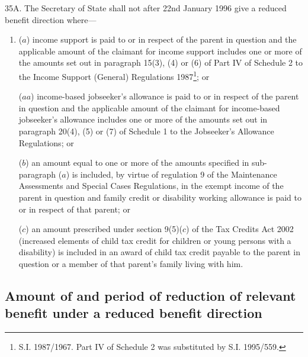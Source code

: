 \documentclass[a4paper,12pt]{article}
\begin{document}
35A.  
The Secretary of State  %
shall not after 22nd January 1996 give a reduced benefit direction where—
\begin{enumerate}\item[]
($a$) income support is paid to or in respect of the parent in question and the applicable amount of the claimant for income support includes one or more of the amounts set out in paragraph 15(3), (4) or (6) of Part IV of Schedule 2 to the Income Support (General) Regulations 1987\footnote{\frenchspacing S.I. 1987/1967. Part IV of Schedule 2 was substituted by S.I. 1995/559.}; or

($aa$) income-based jobseeker’s allowance is paid to or in respect of the parent in question and the applicable amount of the claimant for income-based jobseeker’s allowance includes one or more of the amounts set out in paragraph 20(4), (5) or (7) of Schedule 1 to the Jobseeker’s Allowance Regulations; or

($b$) an amount equal to one or more of the amounts specified in sub-paragraph ($a$) is included, by virtue of regulation 9 of the Maintenance Assessments and Special Cases Regulations, in the exempt income of the parent in question and family credit or disability working allowance is paid to or in respect of that parent;
%
or

    ($c$) 
    an amount prescribed under section 9(5)($c$)  of the Tax Credits Act 2002 (increased elements of child tax credit for children or young persons with a disability) is included in an award of child tax credit payable to the parent in question or a member of that parent’s family living with him.
\end{enumerate}


\subsection[36. Amount of and period of reduction of relevant benefit under a reduced benefit direction]{Amount of and period of reduction of relevant benefit under a reduced benefit direction}
\end{document}
